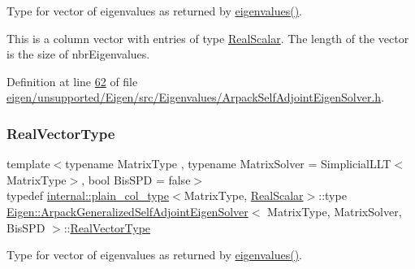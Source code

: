 Type for vector of eigenvalues as returned by \hyperlink{class_eigen_1_1_arpack_generalized_self_adjoint_eigen_solver_ab46900dafdd11a8ac05a662c6b41480d}{eigenvalues()}. 

This is a column vector with entries of type \hyperlink{class_eigen_1_1_arpack_generalized_self_adjoint_eigen_solver_a2555af55e53bf9de894a49e639be2e1e}{Real\+Scalar}. The length of the vector is the size of {\ttfamily nbr\+Eigenvalues}. 

Definition at line \hyperlink{eigen_2unsupported_2_eigen_2src_2_eigenvalues_2_arpack_self_adjoint_eigen_solver_8h_source_l00062}{62} of file \hyperlink{eigen_2unsupported_2_eigen_2src_2_eigenvalues_2_arpack_self_adjoint_eigen_solver_8h_source}{eigen/unsupported/\+Eigen/src/\+Eigenvalues/\+Arpack\+Self\+Adjoint\+Eigen\+Solver.\+h}.

\mbox{\label{class_eigen_1_1_arpack_generalized_self_adjoint_eigen_solver_a47a5becb6dda25dbd90a1704a8247dd8}} 
\subsubsection{\texorpdfstring{Real\+Vector\+Type}{RealVectorType}\hspace{0.1cm}{\footnotesize\ttfamily [2/2]}}
{\footnotesize\ttfamily template$<$typename Matrix\+Type , typename Matrix\+Solver  = Simplicial\+L\+L\+T$<$\+Matrix\+Type$>$, bool Bis\+S\+PD = false$>$ \\
typedef \hyperlink{struct_eigen_1_1internal_1_1plain__col__type}{internal\+::plain\+\_\+col\+\_\+type}$<$Matrix\+Type, \hyperlink{class_eigen_1_1_arpack_generalized_self_adjoint_eigen_solver_a2555af55e53bf9de894a49e639be2e1e}{Real\+Scalar}$>$\+::type \hyperlink{class_eigen_1_1_arpack_generalized_self_adjoint_eigen_solver}{Eigen\+::\+Arpack\+Generalized\+Self\+Adjoint\+Eigen\+Solver}$<$ Matrix\+Type, Matrix\+Solver, Bis\+S\+PD $>$\+::\hyperlink{class_eigen_1_1_arpack_generalized_self_adjoint_eigen_solver_a47a5becb6dda25dbd90a1704a8247dd8}{Real\+Vector\+Type}}



Type for vector of eigenvalues as returned by \hyperlink{class_eigen_1_1_arpack_generalized_self_adjoint_eigen_solver_ab46900dafdd11a8ac05a662c6b41480d}{eigenvalues()}. 


